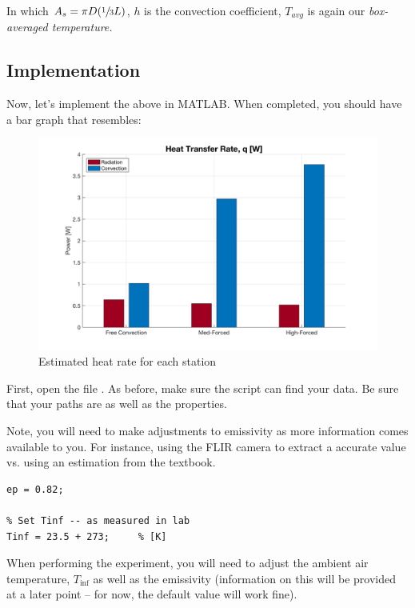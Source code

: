 \documentclass[11pt, letterpaper]{article}
\begin{document}
\n
In which $ A_s = \pi D ( \sfrac{1}{3} L )$, $h$ is the convection coefficient, $T_{avg}$ is again our \it{box-averaged} temperature. 

\n
\subsection{Implementation}

Now, let's implement the above in MATLAB. When completed, you should have a bar graph that resembles:

\begin{figure}[H]
    \begin{center}
        \includegraphics[width=120mm]{gfx/rad_estimation.png}
    \caption{Estimated heat rate for each station}\label{fig5}
    \end{center}
\end{figure}

\n
First, open the file . As before, make sure the script can find your data. Be sure that your paths are as well as the properties.

Note, you will need to make adjustments to emissivity as more information comes available to you. For instance, using the FLIR camera to extract a accurate value vs. using an estimation from the textbook.
\begin{lstlisting}[numbers=none]
% calibrated ep from FLIR camera (0.78 - 0.82)
ep = 0.82;

% Set Tinf -- as measured in lab
Tinf = 23.5 + 273;     % [K]
\end{lstlisting}

When performing the experiment, you will need to adjust the ambient air temperature, $T_{\inf}$ as well as the emissivity (information on this will be provided at a later point -- for now, the default value will work fine).
\end{document}
